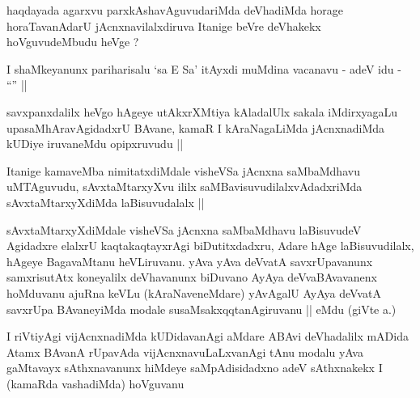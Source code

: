 
\begin{artha}
haqdayada agarxvu parxkAshavAguvudariMda deVhadiMda horage
horaTavanAdarU jAcnxnavilalxdiruva Itanige beVre deVhakekx
hoVguvudeMbudu heVge ?
\end{artha}


\begin{artha}
I shaMkeyanunx pariharisalu `sa E Sa' itAyxdi muMdina vacanavu - adeV
idu - ``\stext'' || 
\end{artha}


\begin{artha}
savxpanxdalilx heVgo hAgeye utAkxrXMtiya kAladalUlx sakala
iMdirxyagaLu upasaMhAravAgidadxrU BAvane, kamaR I kAraNagaLiMda
jAcnxnadiMda kUDiye iruvaneMdu opipxruvudu ||
\end{artha}


\begin{artha}
Itanige kamaveMba nimitatxdiMdale visheVSa jAcnxna saMbaMdhavu
uMTAguvudu, sAvxtaMtarxyXvu ililx saMBavisuvudilalxvAdadxriMda
sAvxtaMtarxyXdiMda laBisuvudalalx ||
\end{artha}


\begin{artha}
sAvxtaMtarxyXdiMdale visheVSa jAcnxna saMbaMdhavu laBisuvudeV
Agidadxre elalxrU kaqtakaqtayxrAgi biDutitxdadxru, Adare hAge
laBisuvudilalx, hAgeye BagavaMtanu heVLiruvanu. yAva yAva deVvatA
savxrUpavanunx samxrisutAtx koneyalilx deVhavanunx biDuvano AyAya
deVvaBAvavanenx hoMduvanu ajuRna keVLu (kAraNaveneMdare) yAvAgalU
AyAya deVvatA savxrUpa BAvaneyiMda modale susaMsakxqqtanAgiruvanu ||
eMdu (giVte  a.\quad) 
\end{artha}


\begin{artha}
I riVtiyAgi vijAcnxnadiMda kUDidavanAgi aMdare ABAvi deVhadalilx
mADida Atamx BAvanA rUpavAda vijAcnxnavuLaLxvanAgi tAnu modalu yAva
gaMtavayx sAthxnavanunx hiMdeye saMpAdisidadxno adeV sAthxnakekx I
(kamaRda vashadiMda) hoVguvanu
\end{artha}

